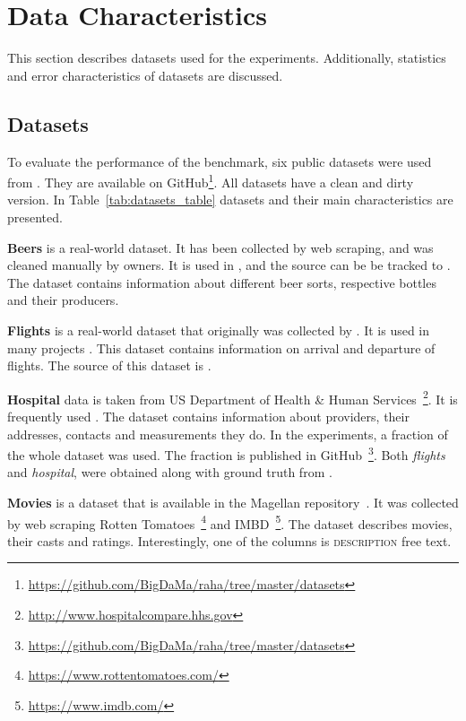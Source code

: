 \section{Data Characteristics}
\label{sec:data_charcteristics}

This section describes datasets used for the experiments.
Additionally, statistics and error characteristics of datasets are discussed.

\subsection{Datasets}



To evaluate the performance of the benchmark, six public datasets were used from \textcite{MahdaviAFMQST2019, MahdaviA2020}. 
They are available on GitHub\footnote{\url{https://github.com/BigDaMa/raha/tree/master/datasets}}.
All datasets have a clean and dirty version.
In Table~\ref{tab:datasets_table} datasets and their main characteristics are presented.

\textbf{Beers} is a real-world dataset. It has been collected by web scraping, and was cleaned manually by owners.
It is used in \textcite{MahdaviAFMQST2019, MahdaviA2020},
and the source can be be tracked to \textcite{Hould2017WEB, Hould2017KAGGLE}. 
The dataset contains information about different beer sorts, respective bottles and their producers.

\textbf{Flights} is a real-world dataset that originally was collected by \textcite{LiDLMS2015}. 
It is used in many projects \cite{holodetect, raha, LiDLMS2015}.
This dataset contains information on arrival and departure of flights.
The source of this dataset is \textcite{LiDLMS2015}.

\textbf{Hospital} data is taken from US Department of Health \& Human Services~\footnote{\url{http://www.hospitalcompare.hhs.gov}}. 
It is frequently used \cite{RestatGCS2022, ChuIP2013, DallachiesaEEEIOT2013, HeidariMIR2019,MahdaviAFMQST2019, MahdaviA2020, RekatsinasCIR2017}.
The dataset contains information about providers, their addresses, contacts and measurements they do.
In the experiments, a fraction of the whole dataset was used.
The fraction is published in GitHub~\footnote{\url{https://github.com/BigDaMa/raha/tree/master/datasets}}.
Both \textit{flights} and \textit{hospital}, were obtained along with ground truth from \textcite{holodetect}.

\textbf{Movies} is a dataset that is available in the Magellan repository~\cite{DasDGGKGP2016, KondaDSDABLPZNPKDR2016}.
It was collected by web scraping Rotten Tomatoes~\footnote{\url{https://www.rottentomatoes.com/}} and IMBD~\footnote{\url{https://www.imdb.com/}}.
The dataset describes movies, their casts and ratings. 
Interestingly, one of the columns is \textsc{description} free text.

